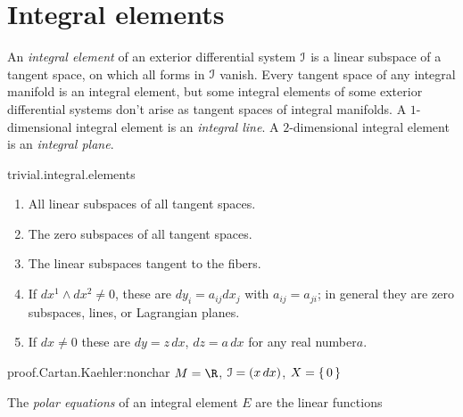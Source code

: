 \section{Integral elements}
An \emph{integral element} of an exterior differential system \(\mathcal{I}\) is a linear subspace of a tangent space, on which all forms in \(\mathcal{I}\) vanish.
Every tangent space of any integral manifold is an integral element, but some integral elements of some exterior differential systems don't arise as tangent spaces of integral manifolds.
A \(1\)-dimensional integral element is an \emph{integral line}. 
A \(2\)-dimensional integral element is an \emph{integral plane}.
%
\begin{answer}{trivial.integral.elements}%
\begin{enumerate}
\item All linear subspaces of all tangent spaces.
\item The zero subspaces of all tangent spaces.
\item The linear subspaces tangent to the fibers.
\item If \(dx^1 \wedge dx^2 \ne 0\), these are \(dy_i=a_{ij} dx_j\) with \(a_{ij}=a_{ji}\); in general they are zero subspaces, lines, or Lagrangian planes.
\item If \(dx\ne 0\) these are \(dy = z \, dx\), \(dz = a \, dx\) for any real number\(a\).
\end{enumerate}
\end{answer}
\begin{answer}{proof.Cartan.Kaehler:nonchar}
\(M=\R\), \(\mathcal{I}=(x \, dx)\), \(X=\set{0}\)
\end{answer}
The \emph{polar equations} of an integral element \(E\) are the linear functions
